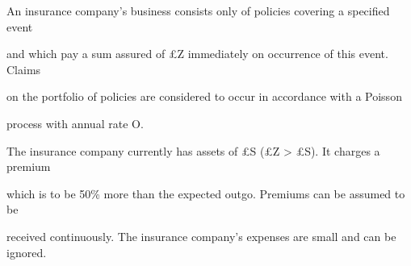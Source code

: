 \documentclass[a4paper,12pt]{article}
\begin{document}

An insurance company’s business consists only of policies covering a specified event

and which pay a sum assured of £Z immediately on occurrence of this event. Claims

on the portfolio of policies are considered to occur in accordance with a Poisson

process with annual rate O.

The insurance company currently has assets of £S (£Z > £S). It charges a premium

which is to be 50\% more than the expected outgo. Premiums can be assumed to be

received continuously. The insurance company’s expenses are small and can be ignored.
\end{document}
